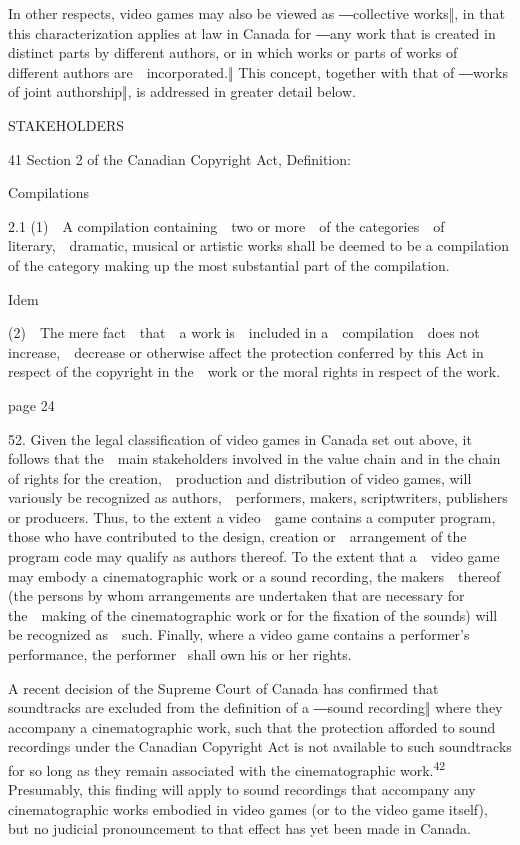 \documentclass[
]{article}
\begin{document}
{In }{other respects, video games may also be viewed as ―collective
works‖, in that this characterization applies at law in Canada for
―}{any work that is created in distinct parts by different authors, or
in which works or parts of works of different authors
are~~incorporated}{.‖ This concept, together with that of ―works of
joint authorship‖, is addressed in greater }{detail below.}

{STAKEHOLDERS}

{41 }{Section 2 of the Canadian }{Copyright Act}{, Definition:}

{Compilations}

{2.1 (1)~~A compilation containing~~two or more~~of the categories~~of
literary,~~dramatic, musical or artistic works shall be deemed to be a
compilation of the category making up the most substantial part of the
compilation.}

{Idem}

{(2)~~The mere fact~~that~~a work is~~included in a~~compilation~~does
not increase,~~decrease or otherwise affect the protection conferred by
this Act in respect of the copyright in the~~work or the moral rights in
respect of the work.}

{page 24}

{52. }{Given the legal classification of video games in Canada set out
above, it follows that the~~main stakeholders involved in the value
chain and in the chain of rights for the creation,~~production and
distribution of video games, will variously be recognized as
authors,~~performers, makers, scriptwriters, publishers or producers.
Thus, to the extent a video~~game contains a computer program, those who
have contributed to the design, creation or~~arrangement of the program
code may qualify as authors thereof. To the extent that a~~video game
may embody a cinematographic work or a sound recording, the
makers~~thereof (the persons by whom arrangements are undertaken that
are necessary for the~~making of the cinematographic work or for the
fixation of the sounds) will be recognized as~~such. }{Finally, where a
video game contains a performer's performance, the performer }{~shall
own his or her rights.}

{A recent decision of the Supreme Court of Canada has confirmed that
soundtracks are }{excluded from the definition of a ―sound recording‖
where they accompany a }{cinematographic work, such that the protection
afforded to sound recordings under the Canadian }{Copyright Act }{is not
available to such soundtracks for so long as they remain associated with
the cinematographic work.}\textsuperscript{{42 }}{Presumably, this
finding will apply to sound recordings that accompany any
cinematographic works embodied in video games (or to the video game
itself), but no judicial pronouncement to that effect has yet been made
in Canada.}
\end{document}
